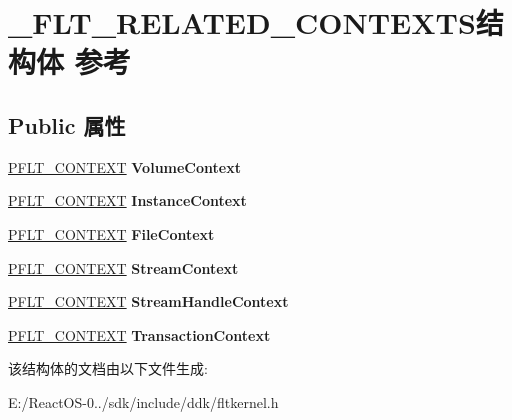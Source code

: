 \hypertarget{struct___f_l_t___r_e_l_a_t_e_d___c_o_n_t_e_x_t_s}{}\section{\+\_\+\+F\+L\+T\+\_\+\+R\+E\+L\+A\+T\+E\+D\+\_\+\+C\+O\+N\+T\+E\+X\+T\+S结构体 参考}
\label{struct___f_l_t___r_e_l_a_t_e_d___c_o_n_t_e_x_t_s}
\subsection*{Public 属性}
\begin{DoxyCompactItemize}
\item 
\mbox{\label{struct___f_l_t___r_e_l_a_t_e_d___c_o_n_t_e_x_t_s_abd6dee58fdc0b272286e19193850da90}} 
\hyperlink{interfacevoid}{P\+F\+L\+T\+\_\+\+C\+O\+N\+T\+E\+XT} {\bfseries Volume\+Context}
\item 
\mbox{\label{struct___f_l_t___r_e_l_a_t_e_d___c_o_n_t_e_x_t_s_ae418d7397fc1dcd92a85ddd94c559106}} 
\hyperlink{interfacevoid}{P\+F\+L\+T\+\_\+\+C\+O\+N\+T\+E\+XT} {\bfseries Instance\+Context}
\item 
\mbox{\label{struct___f_l_t___r_e_l_a_t_e_d___c_o_n_t_e_x_t_s_a215028a9f14f4d25c2547554c56ee1b1}} 
\hyperlink{interfacevoid}{P\+F\+L\+T\+\_\+\+C\+O\+N\+T\+E\+XT} {\bfseries File\+Context}
\item 
\mbox{\label{struct___f_l_t___r_e_l_a_t_e_d___c_o_n_t_e_x_t_s_a1a171f32c5e4dd2a4c317d9886ec4b26}} 
\hyperlink{interfacevoid}{P\+F\+L\+T\+\_\+\+C\+O\+N\+T\+E\+XT} {\bfseries Stream\+Context}
\item 
\mbox{\label{struct___f_l_t___r_e_l_a_t_e_d___c_o_n_t_e_x_t_s_afe7c3a62618490288f833419c74a56aa}} 
\hyperlink{interfacevoid}{P\+F\+L\+T\+\_\+\+C\+O\+N\+T\+E\+XT} {\bfseries Stream\+Handle\+Context}
\item 
\mbox{\label{struct___f_l_t___r_e_l_a_t_e_d___c_o_n_t_e_x_t_s_a1625f3aef026717c96aebe86db653965}} 
\hyperlink{interfacevoid}{P\+F\+L\+T\+\_\+\+C\+O\+N\+T\+E\+XT} {\bfseries Transaction\+Context}
\end{DoxyCompactItemize}


该结构体的文档由以下文件生成\+:\begin{DoxyCompactItemize}
\item 
E\+:/\+React\+O\+S-\/0../sdk/include/ddk/fltkernel.\+h\end{DoxyCompactItemize}
